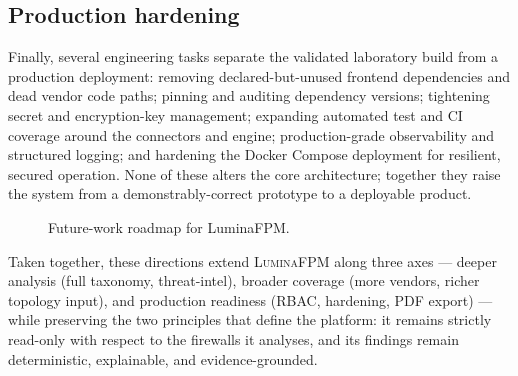 \documentclass[12pt,a4paper]{report}
\renewcommand{\_}{\textunderscore\allowbreak}
\begin{document}
\subsection{Production hardening}
\label{sec:ch5-hardening}

Finally, several engineering tasks separate the validated laboratory build from a production deployment: removing declared-but-unused frontend dependencies and dead vendor code paths; pinning and auditing dependency versions; tightening secret and encryption-key management; expanding automated test and CI coverage around the connectors and engine; production-grade observability and structured logging; and hardening the Docker Compose deployment for resilient, secured operation. None of these alters the core architecture; together they raise the system from a demonstrably-correct prototype to a deployable product.

\begin{figure}[htbp]
\centering
{}
\caption{Future-work roadmap for LuminaFPM.}
\label{fig:ch5-future-roadmap}
\end{figure}

Taken together, these directions extend \textsc{LuminaFPM} along three axes --- deeper analysis (full taxonomy, threat-intel), broader coverage (more vendors, richer topology input), and production readiness (RBAC, hardening, PDF export) --- while preserving the two principles that define the platform: it remains strictly read-only with respect to the firewalls it analyses, and its findings remain deterministic, explainable, and evidence-grounded.
\end{document}

